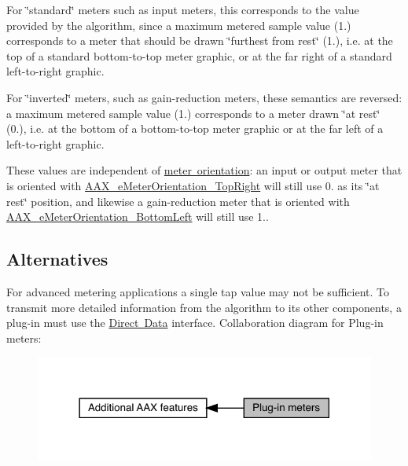 \begin{DoxyItemize}
\item For \char`\"{}standard\char`\"{} meters such as input meters, this corresponds to the value provided by the algorithm, since a maximum metered sample value (1.) corresponds to a meter that should be drawn \char`\"{}furthest from rest\char`\"{} (1.), i.\+e. at the top of a standard bottom-\/to-\/top meter graphic, or at the far right of a standard left-\/to-\/right graphic. \item For \char`\"{}inverted\char`\"{} meters, such as gain-\/reduction meters, these semantics are reversed\+: a maximum metered sample value (1.) corresponds to a meter drawn \char`\"{}at rest\char`\"{} (0.), i.\+e. at the bottom of a bottom-\/to-\/top meter graphic or at the far left of a left-\/to-\/right graphic.\end{DoxyItemize}
These values are independent of \mbox{\hyperlink{a00491_af260f0f9a6bff0f7bfd3200b2947c96b}{meter orientation}}\+: an input or output meter that is oriented with \mbox{\hyperlink{a00491_af260f0f9a6bff0f7bfd3200b2947c96ba0b672f16509ea26e7374306bbb2e1e07}{A\+A\+X\+\_\+e\+Meter\+Orientation\+\_\+\+Top\+Right}} will still use 0. as its \char`\"{}at rest\char`\"{} position, and likewise a gain-\/reduction meter that is oriented with \mbox{\hyperlink{a00491_af260f0f9a6bff0f7bfd3200b2947c96bad6b506082c761babe2cefe133d326e32}{A\+A\+X\+\_\+e\+Meter\+Orientation\+\_\+\+Bottom\+Left}} will still use 1..\hypertarget{a00807_AdditionalFeatures_Meters_alternatives}{}\subsection{Alternatives}\label{a00807_AdditionalFeatures_Meters_alternatives}
For advanced metering applications a single tap value may not be sufficient. To transmit more detailed information from the algorithm to its other components, a plug-\/in must use the \mbox{\hyperlink{a00803}{Direct Data}} interface. Collaboration diagram for Plug-\/in meters\+:
\nopagebreak
\begin{figure}[H]
\begin{center}
\leavevmode
\includegraphics[width=318pt]{a00807}
\end{center}
\end{figure}
